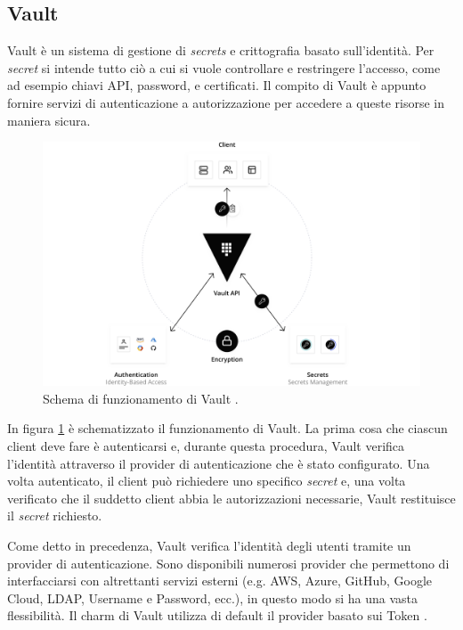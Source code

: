 \subsection{Vault}\label{sec:vault}
Vault è un sistema di gestione di \textit{secrets} e crittografia basato sull'identità. Per \textit{secret} si intende tutto ciò a cui si vuole controllare e restringere l'accesso, come ad esempio chiavi API, password, e certificati. Il compito di Vault è appunto fornire servizi di autenticazione a autorizzazione per accedere a queste risorse in maniera sicura.
\begin{figure}%
    \centering
    \includegraphics[width=0.9\linewidth]{tesi/files/immagini/vault_schema.png}
    \caption{Schema di funzionamento di Vault \cite{vault_home}.}
    \label{fig:vault_schema}
\end{figure}

In figura \ref{fig:vault_schema} è schematizzato il funzionamento di Vault. La prima cosa che ciascun client deve fare è autenticarsi e, durante questa procedura, Vault verifica l'identità attraverso il provider di autenticazione che è stato configurato. Una volta autenticato, il client può richiedere uno specifico \textit{secret} e, una volta verificato che il suddetto client abbia le autorizzazioni necessarie, Vault restituisce il \textit{secret} richiesto.

Come detto in precedenza, Vault verifica l'identità degli utenti tramite un provider di autenticazione. Sono disponibili numerosi provider che permettono di interfacciarsi con altrettanti servizi esterni (e.g. AWS, Azure, GitHub, Google Cloud, LDAP, Username e Password, ecc.), in questo modo si ha una vasta flessibilità. Il charm di Vault utilizza di default il provider basato sui Token \cite{vault_documentation}.

